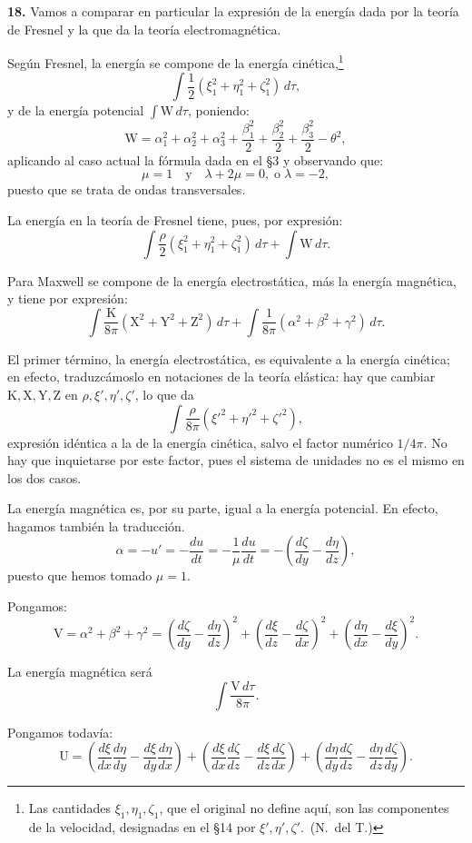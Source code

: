 \noindent\textbf{18.} Vamos a comparar en particular la expresión de la
energía dada por la teoría de Fresnel y la que da la teoría
electromagnética.

Según Fresnel, la energía se compone de la energía cinética,\footnote{Las
cantidades $\xi_1,\eta_1,\zeta_1$, que el original no define aquí, son las
componentes de la velocidad, designadas en el §14 por
$\xi',\eta',\zeta'$.~(N.~del T.)}
\[
\int\frac{1}{2}(\xi_1^2+\eta_1^2+\zeta_1^2)\,d\tau,
\]
y de la energía potencial $\int\mathrm{W}\,d\tau$, poniendo:
\[
\mathrm{W}=\alpha_1^2+\alpha_2^2+\alpha_3^2+\frac{\beta_1^2}{2}
+\frac{\beta_2^2}{2}+\frac{\beta_3^2}{2}-\theta^2,
\]
aplicando al caso actual la fórmula dada en el §3 y
observando que:
\[
\mu=1\quad\text{y}\quad \lambda+2\mu=0,\;\text{o}\;\lambda=-2,
\]
puesto que se trata de ondas transversales.

La energía en la teoría de Fresnel tiene, pues, por expresión:
\[
\int\frac{\rho}{2}(\xi_1^2+\eta_1^2+\zeta_1^2)\,d\tau+\int\mathrm{W}\,d\tau.
\]

Para Maxwell se compone de la energía electrostática, más la energía
magnética, y tiene por expresión:
\[
\int\frac{\mathrm{K}}{8\pi}(\mathrm{X}^2+\mathrm{Y}^2+\mathrm{Z}^2)\,d\tau
+\int\frac{1}{8\pi}(\alpha^2+\beta^2+\gamma^2)\,d\tau.
\]

El primer término, la energía electrostática, es equivalente a la energía
cinética; en efecto, traduzcámoslo en notaciones de la teoría elástica: hay
que cambiar $\mathrm{K},\mathrm{X},\mathrm{Y},\mathrm{Z}$ en
$\rho,\xi',\eta',\zeta'$, lo que da
\[
\int\frac{\rho}{8\pi}(\xi'^2+\eta'^2+\zeta'^2),
\]
expresión idéntica a la de la energía cinética, salvo el factor numérico
$1/4\pi$. No hay que inquietarse por este factor, pues el sistema de
unidades no es el mismo en los dos casos.

La energía magnética es, por su parte, igual a la energía potencial. En
efecto, hagamos también la traducción.
\[
\alpha=-u'=-\frac{du}{dt}=-\frac{1}{\mu}\frac{du}{dt}
=-\left(\frac{d\zeta}{dy}-\frac{d\eta}{dz}\right),
\]
puesto que hemos tomado $\mu=1$.

Pongamos:
\[
\mathrm{V}=\alpha^2+\beta^2+\gamma^2
=\left(\frac{d\zeta}{dy}-\frac{d\eta}{dz}\right)^2
+\left(\frac{d\xi}{dz}-\frac{d\zeta}{dx}\right)^2
+\left(\frac{d\eta}{dx}-\frac{d\xi}{dy}\right)^2.
\]

La energía magnética será
\[
\int\frac{\mathrm{V}\,d\tau}{8\pi}.
\]

Pongamos todavía:
\[
\mathrm{U}=\left(\frac{d\xi}{dx}\frac{d\eta}{dy}-\frac{d\xi}{dy}\frac{d\eta}{dx}\right)
+\left(\frac{d\xi}{dx}\frac{d\zeta}{dz}-\frac{d\xi}{dz}\frac{d\zeta}{dx}\right)
+\left(\frac{d\eta}{dy}\frac{d\zeta}{dz}-\frac{d\eta}{dz}\frac{d\zeta}{dy}\right).
\]

